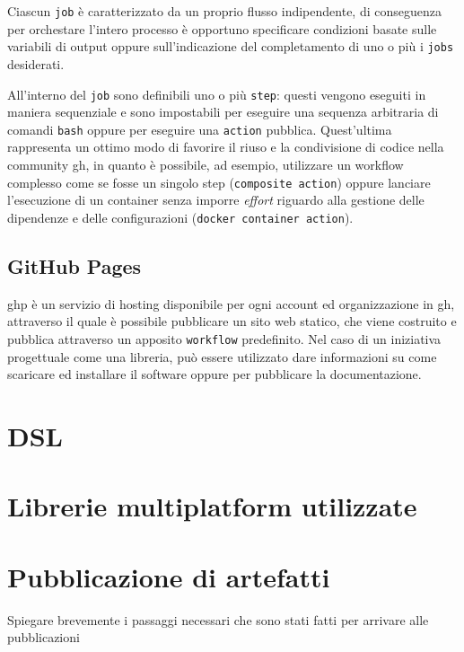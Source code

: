 \documentclass[12pt,a4paper,openright,twoside]{book}
\begin{document}
Ciascun \texttt{job} è caratterizzato da un proprio flusso indipendente, di conseguenza
per orchestare l'intero processo è opportuno specificare condizioni basate sulle variabili di output 
oppure sull'indicazione del completamento di uno o più i \texttt{jobs} desiderati.

All'interno del \texttt{job} sono definibili uno o più \texttt{step}: questi vengono eseguiti in maniera sequenziale
e sono impostabili per eseguire una sequenza arbitraria di comandi \texttt{bash} oppure
per eseguire una \texttt{action} pubblica.
Quest'ultima rappresenta un ottimo modo di favorire il riuso
e la condivisione di codice nella community \ac{gh}, in quanto è possibile, ad esempio, utilizzare un workflow complesso
come se fosse un singolo step (\texttt{composite action}) oppure lanciare l'esecuzione di un container senza
imporre \textit{effort} riguardo alla gestione delle dipendenze e delle configurazioni (\texttt{docker container action}).

\subsection{GitHub Pages}
 \ac{ghp} è un servizio di hosting disponibile per ogni account ed organizzazione in \ac{gh},
 attraverso il quale è possibile pubblicare un sito web statico, che viene costruito e
 pubblica attraverso un apposito \texttt{workflow} predefinito. 
 Nel caso di un iniziativa progettuale come una libreria, può essere utilizzato dare informazioni 
 su come scaricare ed installare il software oppure per pubblicare la documentazione.

\section{DSL }

\section{Librerie multiplatform utilizzate}

\section{Pubblicazione di artefatti}
Spiegare brevemente i passaggi necessari che sono stati fatti per arrivare
alle pubblicazioni
\end{document}
